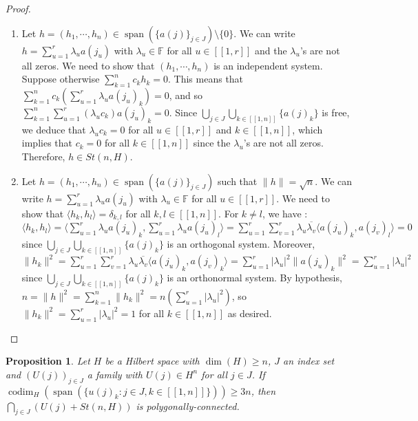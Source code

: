 \documentclass[a4paper,12pt]{article}
\DeclareMathOperator{\Span}{span}
\DeclareMathOperator{\codim}{codim}
\theoremstyle{plain}
\newtheorem{proposition}{Proposition}[section]
\theoremstyle{definition}
\theoremstyle{remark}
\begin{document}
\begin{proof}
\begin{enumerate}
\item Let $h = (h_1,\cdots,h_n) \in \Span( \{a(j)\}_{j \in J} ) \setminus \{0\}$. We can write $h = \sum_{u=1}^r \lambda_u a(j_u)$ with $\lambda_u \in \mathbb{F}$ for all $u \in [\![1,r]\!]$ and the $\lambda_u$'s are not all zeros. We need to show that $(h_1,\cdots,h_n)$ is an independent system. Suppose otherwise $\sum_{k=1}^n c_k h_k = 0$. This means that $\sum_{k=1}^n c_k ( \sum_{u=1}^r \lambda_u a(j_u)_k) = 0$, and so $\sum_{k=1}^n \sum_{u=1}^r (\lambda_u c_k) a(j_u)_k = 0$. Since $\bigcup_{j \in J} \bigcup_{k \in [\![1,n]\!]} \{a(j)_k\}$ is free, we deduce that $\lambda_u c_k = 0$ for all $u \in [\![1,r]\!]$ and $k \in [\![1,n]\!]$, which implies that $c_k = 0$ for all $k \in [\![1,n]\!]$ since the $\lambda_u$'s are not all zeros. Therefore, $h \in St(n,H)$.

\item Let $h = (h_1,\cdots,h_n) \in \Span(\{a(j)\}_{j \in J})$ such that $\|h\| = \sqrt{n}$. We can write $h = \sum_{u=1}^r \lambda_u a(j_u)$ with $\lambda_u \in \mathbb{F}$ for all $u \in [\![1,r]\!]$. We need to show that $\langle h_k , h_l \rangle = \delta_{k,l}$ for all $k,l \in [\![1,n]\!]$. For $k \neq l$, we have : $\langle h_k , h_l \rangle = \langle \sum_{u=1}^r \lambda_u a(j_u)_k , \sum_{u=1}^r \lambda_u a(j_u)_l \rangle = \sum_{u=1}^r \sum_{v=1}^r \lambda_u \overline{\lambda_v} \langle a(j_u)_k , a(j_v)_l \rangle = 0$ since $\bigcup_{j \in J} \bigcup_{k \in [\![1,n]\!]} \{a(j)_k\}$ is an orthogonal system. Moreover, $\| h_k \|^2 = \sum_{u=1}^r \sum_{v=1}^r \lambda_u \overline{\lambda_v} \langle a(j_u)_k , a(j_v)_k \rangle = \sum_{u=1}^r |\lambda_u|^2 \| a(j_u)_k \| ^2 = \sum_{u=1}^r |\lambda_u|^2$ since $\bigcup_{j \in J} \bigcup_{k \in [\![1,n]\!]} \{a(j)_k\}$ is an orthonormal system. By hypothesis, $n = \| h \| ^ 2 = \sum_{k=1}^n \| h_k \|^2 = n (\sum_{u=1}^r |\lambda_u|^2)$, so $\| h_k \|^2 = \sum_{u=1}^r |\lambda_u|^2 = 1$ for all $k \in [\![1,n]\!]$ as desired.
\end{enumerate}
\end{proof}

\begin{proposition}
Let $H$ be a Hilbert space with $\dim(H) \geq n$, $J$ an index set and $(U(j))_{j \in J}$ a family with $U(j) \in H^n$ for all $j \in J$. If $\codim_H(\Span(\{u(j)_k : j \in J, k \in [\![1,n]\!]\})) \geq 3n$, then $\bigcap_{j \in J} (U(j) + St(n,H))$ is polygonally-connected. 
\end{proposition}
\end{document}

